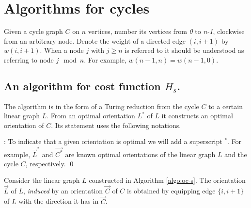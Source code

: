 \section{Algorithms for cycles}\label{s.c}
Given a cycle graph $C$ on $n$ vertices, number its vertices from \textit{0} to \textit{n-1}, 
clockwise from an arbitrary node. 
Denote the weight of a directed
edge $(i,i+1)$ by $w(i,i+1)$. When a node $j$ with $j\geq n$ is referred to it 
should be understood as referring to node $j \mod n$. 
For example, $w(n-1,n)=w(n-1,0)$.

\subsection{An algorithm for cost function $H_s$.}

The algorithm is in the form of a Turing reduction from the cycle $C$ to a certain linear graph
$L$. From an optimal orientation $L^*$ of $L$ it constructs an optimal orientation of $C$.
Its statement uses the following notations.

: To indicate that a given orientation is optimal 
we will add a superscript $^*$.
For example, $\vec{L}^*$ and $\vec{C^*}$ are known optimal orientations of 
the linear graph $L$ and the cycle $C$,
respectively.
\qed
\begin{definition}
	Consider the linear graph $L$ constructed in Algorithm \ref{algo:oc-s}. 
	The orientation $\vec{L}$ of $L$, \emph{induced} by an orientation $\vec{C}$ 
	of $C$ is obtained by equipping edge $\{i,i+1\}$ of $L$ with the direction it 
	has in $\vec{C}$.
\end{definition}

